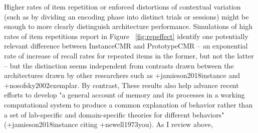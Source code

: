 {}Higher rates of item repetition or enforced distortions of contextual variation (such as by dividing an encoding phase into distinct trials or sessions) might be enough to more clearly distinguish architecture performance. Simulations of high rates of item repetitions report in Figure ~\ref{fig:repeffect} identify one potentially relevant difference between InstanceCMR and PrototypeCMR -- an exponential rate of increase of recall rates for repeated items in the former, but not the latter -- but the distinction seems independent from contrasts drawn between the architectures drawn by other researchers such as +{}{}{jamieson2018instance} and +{}{}{nosofsky2002exemplar}. By contrast, \markdownRendererInterblockSeparator
{}These results also help advance recent efforts to develop "a general account of memory and its processes in a working computational system to produce a common explanation of behavior rather than a set of lab-specific and domain-specific theories for different behaviors" (+{}{}{jamieson2018instance} citing +{}{}{newell1973you}). As I review above,\relax